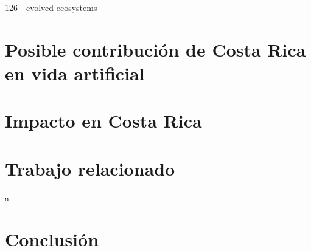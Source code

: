\documentclass[conference]{IEEEtran}
\begin{document}

126 - evolved ecosystems

\section{Posible contribuci\'on de Costa Rica en vida artificial}


\section{Impacto en Costa Rica}


\section{Trabajo relacionado}a


\section{Conclusi\'on}

\nocite{*}



\end{document}
